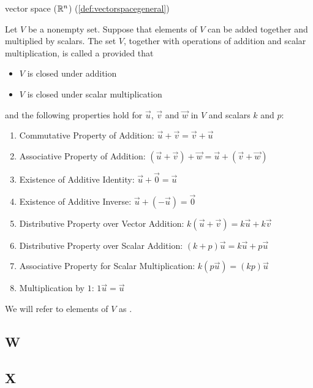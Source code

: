 \documentclass{ximera}
\begin{document}
vector space (\href{https://ximera.osu.edu/oerlinalg/LinearAlgebra/VSP-0020/main}{$\mathbb{R}^n$})
(\ref{def:vectorspacegeneral})
\begin{expandable}
    Let $V$ be a nonempty set.  Suppose that elements of $V$ can be added together and multiplied by scalars.  The set $V$, together with operations of addition and scalar multiplication, is called a  provided that 
  \begin{itemize}
  \item[] $V$ is closed under addition
  \item[] $V$ is closed under scalar multiplication
  \end{itemize}
  and the following properties hold for $\vec{u}$, $\vec{v}$ and $\vec{w}$ in $V$ and scalars $k$ and $p$:
  \begin{enumerate}
   \item \label{item:commaddvectspdef}
  Commutative Property of Addition:\quad
  $\vec{u}+\vec{v}=\vec{v}+\vec{u}$
  \item \label{item:assaddvectspdef}
  Associative Property of Addition:\quad
  $(\vec{u}+\vec{v})+\vec{w}=\vec{u}+(\vec{v}+\vec{w})$
  \item \label{item:idaddvectspdef}
  Existence of Additive Identity:\quad
  $\vec{u}+\vec{0}=\vec{u}$
  \item \label{item:invaddvectspdef}
  Existence of Additive Inverse:\quad
  $\vec{u}+(-\vec{u})=\vec{0}$
  \item \label{item:distvectaddvectspdef}
  Distributive Property over Vector Addition:\quad
  $k(\vec{u}+\vec{v})=k\vec{u}+k\vec{v}$
  \item \label{item:distscalaraddvectspdef}
  Distributive Property over Scalar Addition:\quad
  $(k+p)\vec{u}=k\vec{u}+p\vec{u}$
  \item \label{item:assmultvectspdef}
  Associative Property for Scalar Multiplication:\quad
  $k(p\vec{u})=(kp)\vec{u}$
  \item \label{item:idmultvectspdef}
  Multiplication by $1$:\quad
  $1\vec{u}=\vec{u}$
  \end{enumerate}
We will refer to elements of $V$ as .  
\end{expandable}

\subsection{W}

\subsection{X}
\end{document}

